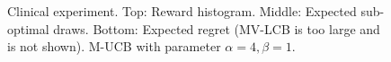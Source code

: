 \begin{figure}[t]
    \caption{ Clinical experiment. Top: Reward histogram.
    Middle: Expected sub-optimal draws.
    Bottom: Expected regret (MV-LCB is too large and is not shown).
    M-UCB with parameter $\alpha = 4, \beta = 1$.}
    \label{fig: Glinoma Clinical Treatment.}%
\end{figure}

